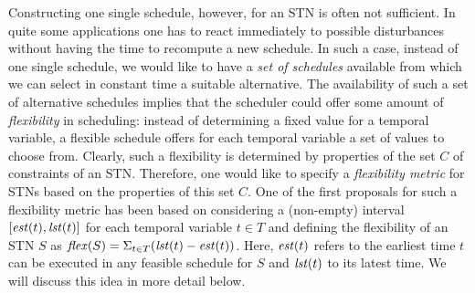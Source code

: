 Constructing one single schedule, however, for an STN is often not sufficient. In quite some applications one has to react immediately to possible disturbances without having the time to recompute a new schedule. In such a case, instead of one single schedule, we would like to have a \emph{set of schedules} available from which we can select in constant time a suitable alternative. The availability of such a set of alternative schedules implies that the scheduler could offer some amount of \emph{flexibility} in scheduling: instead of determining a fixed value for a temporal variable, a flexible schedule offers for each temporal variable a set of values  to choose from.
Clearly, such a flexibility is determined by properties of the set $C$ of constraints of an STN. Therefore, one would like to specify a \emph{flexibility metric} for STNs based on the properties of this set $C$. 
One of the first proposals \cite{policella:2004,pollack:2005} for such a flexibility  metric has been based on considering a (non-empty) interval $[\mathit{est}(t), \mathit{lst}(t)]$ for each temporal  variable $t \in T$ and defining the flexibility of an STN $S$ as $\mathit{flex}(S) = \Sigma_{t \in T} (\mathit{lst}(t) - \mathit{est}(t))$. Here, $\mathit{est}(t)$ refers to the earliest time $t$ can be executed in any feasible schedule for $S$ and $\mathit{lst}(t)$ to its latest time.
We will discuss this idea in more detail below.

